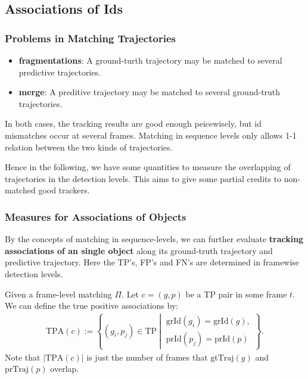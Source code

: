 \documentclass[slidetop, mathserif]{beamer}
\begin{document}
\subsection{Associations of Ids}

\begin{frame}
	\frametitle{Problems in Matching Trajectories}
	
	\begin{itemize}
		\item {\bf fragmentations}:
		      A ground-turth trajectory may be matched
		      to several predictive trajectories.
		\item {\bf merge}:
		      A preditive trajectory may be matched to several ground-truth trajectories.
	\end{itemize}
	In both cases, the tracking results are good enough peicewisely,
	but id mismatches occur at several frames.
	Matching in sequence levels only allows 1-1 relation
	between the two kinds of trajectories.
	
	\vspace{4pt}
	
	Hence in the following, we have some quantities to measure
	the overlapping of trajectories in the detection levels.
	This aims to give some partial credits to non-matched good trackers.
	
\end{frame}

\begin{frame}
	\frametitle{Measures for Associations of Objects}
	
	By the concepts of matching in sequence-levels,
	we can further evaluate {\bf tracking associations of an single object}
	along its ground-truth trajectory and predictive trajectory.
	{\color{red} Here the TP's, FP's and FN's are determined in framewise detection levels.}
	
	\vspace{4pt}
	
	Given a frame-level matching $\Pi$.
	Let $c = (g,p)$ be a TP pair in some frame $t$. We can define the true positive
	associations by:
	\begin{align*}
		\text{TPA}(c) :=                       
		\left\{(g_i, p_j)\in\text{TP}\ \left|\ 
		\begin{array}{c}                       
		\text{grId}(g_i)=\text{grId}(g),       \\
		\text{prId}(p_j) = \text{prId}(p)      
		\end{array}\right.                     
		\right\}.                              
	\end{align*}
	Note that $|\text{TPA}(c)|$ is just the number of frames that $\text{gtTraj}(g)$
	and $\text{prTraj}(p)$ overlap.
	
\end{frame}
\end{document}
